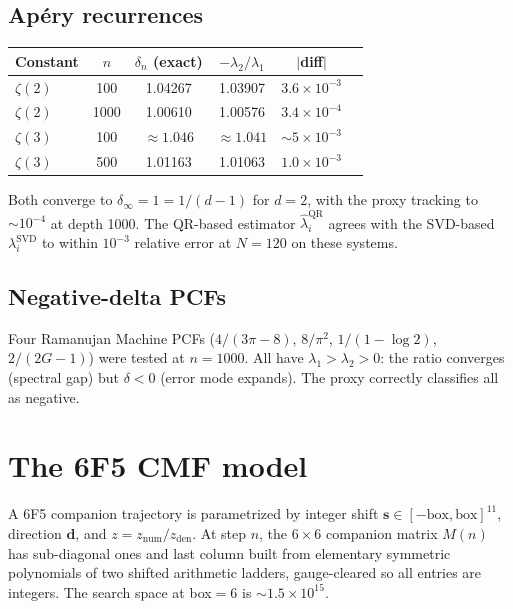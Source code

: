 \documentclass[11pt]{article}
\begin{document}
\subsection{Ap\'ery recurrences}

\begin{center}
\begin{tabular}{lccccc}
\toprule
Constant & $n$ & $\delta_n$ (exact) & $-\lambda_2/\lambda_1$ & $|$diff$|$ \\
\midrule
$\zeta(2)$ & 100 & 1.04267 & 1.03907 & $3.6 \times 10^{-3}$ \\
$\zeta(2)$ & 1000 & 1.00610 & 1.00576 & $3.4 \times 10^{-4}$ \\
$\zeta(3)$ & 100 & $\approx 1.046$ & $\approx 1.041$ & $\sim 5 \times 10^{-3}$ \\
$\zeta(3)$ & 500 & 1.01163 & 1.01063 & $1.0 \times 10^{-3}$ \\
\bottomrule
\end{tabular}
\end{center}

Both converge to $\delta_\infty = 1 = 1/(d-1)$ for $d=2$, with the proxy tracking to $\sim 10^{-4}$ at depth 1000. The QR-based estimator $\widehat\lambda_i^{\mathrm{QR}}$ agrees with the SVD-based $\lambda_i^{\mathrm{SVD}}$ to within $10^{-3}$ relative error at $N=120$ on these systems.

\subsection{Negative-delta PCFs}

Four Ramanujan Machine PCFs ($4/(3\pi{-}8)$, $8/\pi^2$, $1/(1{-}\log 2)$, $2/(2G{-}1)$) were tested at $n=1000$. All have $\lambda_1 > \lambda_2 > 0$: the ratio converges (spectral gap) but $\delta < 0$ (error mode expands). The proxy correctly classifies all as negative.

\section{The 6F5 CMF model}

A 6F5 companion trajectory is parametrized by integer shift $\mathbf{s} \in [-\text{box},\text{box}]^{11}$, direction $\mathbf{d}$, and $z = z_{\text{num}}/z_{\text{den}}$. At step $n$, the $6 \times 6$ companion matrix $M(n)$ has sub-diagonal ones and last column built from elementary symmetric polynomials of two shifted arithmetic ladders, gauge-cleared so all entries are integers. The search space at box$=6$ is $\sim 1.5 \times 10^{15}$.
\end{document}
